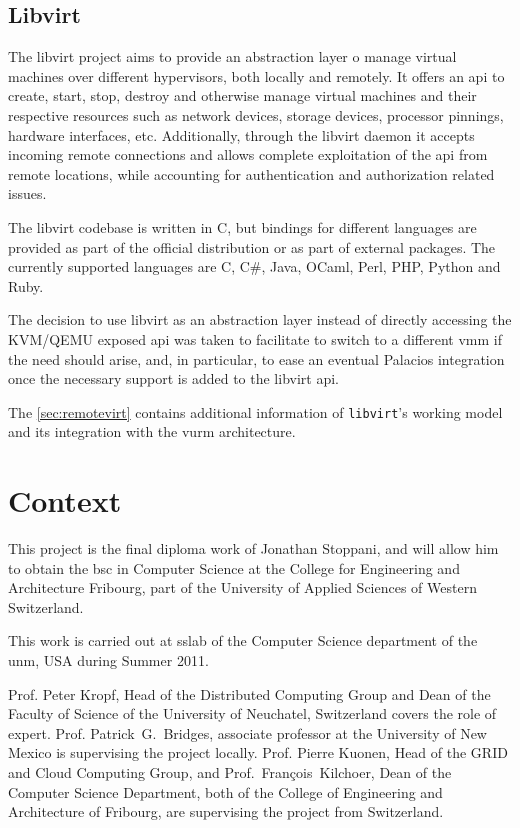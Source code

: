 \subsection*{Libvirt}
\label{sec:libvirt}

The libvirt project aims to provide an abstraction layer o manage virtual machines over different hypervisors, both locally and remotely. It offers an \gls{api} to create, start, stop, destroy and otherwise manage virtual machines and their respective resources such as network devices, storage devices, processor pinnings, hardware interfaces, etc. Additionally, through the libvirt daemon it accepts incoming remote connections and allows complete exploitation of the \gls{api} from remote locations, while accounting for authentication and authorization related issues.

The libvirt codebase is written in C, but bindings for different languages are provided as part of the official distribution or as part of external packages. The currently supported languages are C, C\#, Java, OCaml, Perl, PHP, Python and Ruby.

The decision to use libvirt as an abstraction layer instead of directly accessing the KVM/QEMU exposed \gls{api} was taken to facilitate to switch to a different \gls{vmm} if the need should arise, and, in particular, to ease an eventual Palacios integration once the necessary support is added to the libvirt \gls{api}.

The \autoref{sec:remotevirt} contains additional information of \texttt{libvirt}'s working model and its integration with the \gls{vurm} architecture.



\section{Context}
\label{sec:context}

This project is the final diploma work of Jonathan Stoppani, and will allow him to obtain the \gls{bsc} in Computer Science at the College for Engineering and Architecture Fribourg, part of the University of Applied Sciences of Western Switzerland.

This work is carried out at \gls{sslab} of the Computer Science department of the \gls{unm}, USA during Summer 2011.

Prof. Peter Kropf, Head of the Distributed Computing Group and Dean of the Faculty of Science of the University of Neuchatel, Switzerland covers the role of expert. Prof. Patrick~G.~Bridges, associate professor at the University of New Mexico is supervising the project locally. Prof. Pierre Kuonen, Head of the GRID and Cloud Computing Group, and Prof.~François~Kilchoer, Dean of the Computer Science Department, both of the College of Engineering and Architecture of Fribourg, are supervising the project from Switzerland.


